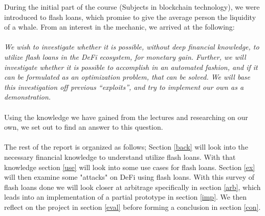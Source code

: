 During the initial part of the course (Subjects in blockchain technology), we
were introduced to flash loans, which promise to give the average person the
liquidity of a whale. From an interest in the mechanic, we arrived at the
following:\\\\
\textit{We wish to investigate whether it is possible, without deep financial
knowledge, to utilize flash loans in the DeFi ecosystem, for monetary
gain. Further, we will investigate whether it is possible to accomplish in
an automated fashion, and if it can be formulated as an optimization
problem, that can be solved. We will base this investigation off previous
``exploits'', and try to implement our own as a demonstration.}\\\\
Using the knowledge we have gained from the lectures and researching on our own,
we set out to find an answer to this question.\\\\
The rest of the report is organized as follows; Section \ref{back}
will look into the necessary financial knowledge to understand utilize
flash loans. With that knowledge section \ref{use} will look into some
use cases for flash loans. Section \ref{ex} will then examine some
"attacks" on DeFi using flash loans. With this survey of flash loans
done we will look closer at arbitrage specifically in section
\ref{arb}, which leads into an implementation of a partial prototype in
section \ref{imp}. We then reflect on the project in section \ref{eval}
before forming a conclusion in section \ref{con}.

